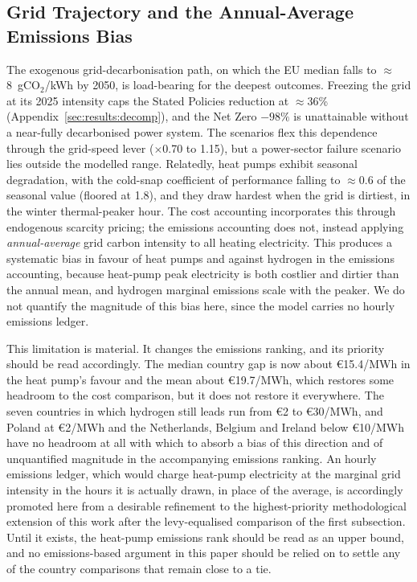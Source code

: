 \subsection{Grid Trajectory and the Annual-Average Emissions Bias}
The exogenous grid-decarbonisation path, on which the EU median falls to
$\approx$8~gCO$_2$/kWh by 2050, is load-bearing for the deepest outcomes.
Freezing the grid at its 2025 intensity caps the Stated Policies reduction at
$\approx$36\% (Appendix~\ref{sec:results:decomp}), and the Net Zero $-98\%$ is
unattainable without a near-fully decarbonised power system. The scenarios flex
this dependence through the grid-speed lever ($\times$0.70 to 1.15), but a
power-sector failure scenario lies outside the modelled range. Relatedly, heat
pumps exhibit seasonal degradation, with the cold-snap coefficient of
performance falling to $\approx$0.6 of the seasonal value (floored at 1.8), and
they draw hardest when the grid is dirtiest, in the winter thermal-peaker hour.
The cost accounting incorporates this through endogenous scarcity pricing; the
emissions accounting does not, instead applying \emph{annual-average} grid
carbon intensity to all heating electricity. This produces a systematic bias in
favour of heat pumps and against hydrogen in the emissions accounting, because heat-pump peak electricity is both costlier and dirtier than the annual mean, and hydrogen marginal emissions scale with the peaker. We do not quantify the
magnitude of this bias here, since the model carries no hourly emissions ledger.

This limitation is material. It changes the emissions ranking, and its priority should
be read accordingly. The median country gap is now about \euro{}15.4/MWh in
the heat pump's favour and the mean about \euro{}19.7/MWh, which restores some
headroom to the cost comparison, but it does not restore it everywhere. The seven
countries in which hydrogen still leads run from \euro{}2 to \euro{}30/MWh, and
Poland at \euro{}2/MWh and the Netherlands, Belgium and Ireland below
\euro{}10/MWh have no headroom at all with which to absorb a bias of this direction
and of unquantified magnitude in the accompanying emissions ranking.
An hourly emissions ledger, which would charge heat-pump electricity at the marginal grid intensity in the hours it is actually drawn, in place of the average,
is accordingly promoted here from a desirable refinement to the highest-priority
methodological extension of this work after the levy-equalised comparison of the
first subsection. Until it exists, the heat-pump emissions rank should be read as
an upper bound, and no emissions-based argument in this paper should be relied on
to settle any of the country comparisons that remain close to a tie.

